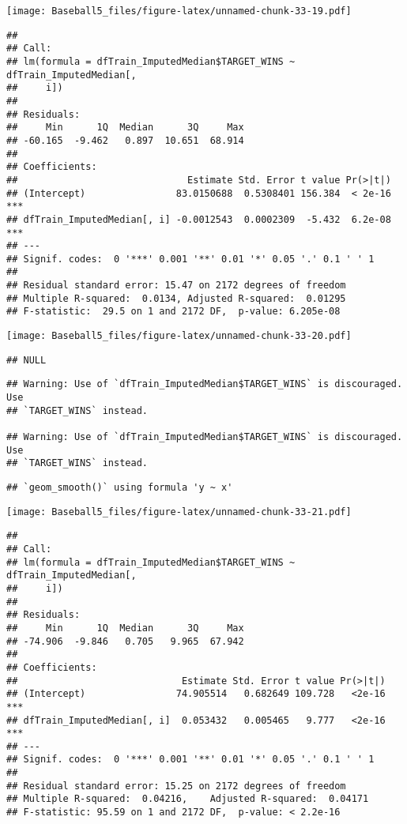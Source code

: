 \documentclass[
]{article}
\begin{document}
\texttt{[image: Baseball5\_files/figure-latex/unnamed-chunk-33-19.pdf]}

\begin{verbatim}
## 
## Call:
## lm(formula = dfTrain_ImputedMedian$TARGET_WINS ~ dfTrain_ImputedMedian[, 
##     i])
## 
## Residuals:
##     Min      1Q  Median      3Q     Max 
## -60.165  -9.462   0.897  10.651  68.914 
## 
## Coefficients:
##                              Estimate Std. Error t value Pr(>|t|)    
## (Intercept)                83.0150688  0.5308401 156.384  < 2e-16 ***
## dfTrain_ImputedMedian[, i] -0.0012543  0.0002309  -5.432  6.2e-08 ***
## ---
## Signif. codes:  0 '***' 0.001 '**' 0.01 '*' 0.05 '.' 0.1 ' ' 1
## 
## Residual standard error: 15.47 on 2172 degrees of freedom
## Multiple R-squared:  0.0134, Adjusted R-squared:  0.01295 
## F-statistic:  29.5 on 1 and 2172 DF,  p-value: 6.205e-08
\end{verbatim}

\texttt{[image: Baseball5\_files/figure-latex/unnamed-chunk-33-20.pdf]}

\begin{verbatim}
## NULL
\end{verbatim}

\begin{verbatim}
## Warning: Use of `dfTrain_ImputedMedian$TARGET_WINS` is discouraged. Use
## `TARGET_WINS` instead.

## Warning: Use of `dfTrain_ImputedMedian$TARGET_WINS` is discouraged. Use
## `TARGET_WINS` instead.
\end{verbatim}

\begin{verbatim}
## `geom_smooth()` using formula 'y ~ x'
\end{verbatim}

\texttt{[image: Baseball5\_files/figure-latex/unnamed-chunk-33-21.pdf]}

\begin{verbatim}
## 
## Call:
## lm(formula = dfTrain_ImputedMedian$TARGET_WINS ~ dfTrain_ImputedMedian[, 
##     i])
## 
## Residuals:
##     Min      1Q  Median      3Q     Max 
## -74.906  -9.846   0.705   9.965  67.942 
## 
## Coefficients:
##                             Estimate Std. Error t value Pr(>|t|)    
## (Intercept)                74.905514   0.682649 109.728   <2e-16 ***
## dfTrain_ImputedMedian[, i]  0.053432   0.005465   9.777   <2e-16 ***
## ---
## Signif. codes:  0 '***' 0.001 '**' 0.01 '*' 0.05 '.' 0.1 ' ' 1
## 
## Residual standard error: 15.25 on 2172 degrees of freedom
## Multiple R-squared:  0.04216,    Adjusted R-squared:  0.04171 
## F-statistic: 95.59 on 1 and 2172 DF,  p-value: < 2.2e-16
\end{verbatim}
\end{document}
